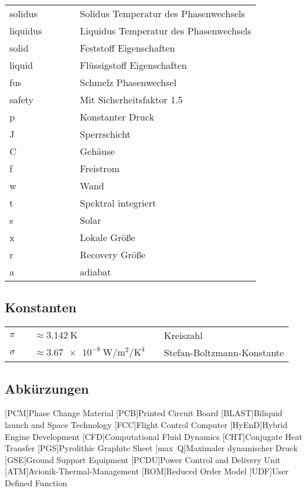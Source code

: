 \begin{supertabular}{p{10mm}p{3mm}p{20mm}p{3mm}l}
solidus && && Solidus Temperatur des Phasenwechsels\\
liquidus && && Liquidus Temperatur des Phasenwechsels\\
solid && && Feststoff Eigenschaften\\
liquid && && Flüssigstoff Eigenschaften\\
fus && && Schmelz Phasenwechsel\\
safety && && Mit Sicherheitsfaktor 1.5\\
p && && Konstanter Druck\\
J && && Sperrschicht\\
C && && Gehäuse\\
f && && Freistrom\\
w && && Wand\\
t && && Spektral integriert\\
s && && Solar\\
x && && Lokale Größe\\
r && && Recovery Größe\\
a && && adiabat\\
\end{supertabular} 

\subsection*{Konstanten}

\begin{supertabular}{p{10mm}p{3mm}p{50mm}p{3mm}l}
$\pi$ && $\approx \SI{3.142}{\kelvin}$ && Kreiszahl\\
$\sigma$ && $\approx \SI{3.67e-8}{\watt\per\meter\squared\per\kelvin\tothe{4}}$ && Stefan-Boltzmann-Konstante\\
\end{supertabular}

\newpage

\subsection*{Abkürzungen}
\begin{acronym}[BLAST]
[PCM]{Phase Change Material}
[PCB]{Printed Circuit Board}
[BLAST]{Biliquid launch and Space Technology}
[FCC]{Flight Control Computer}
[HyEnD]{Hybrid Engine Development}
[CFD]{Computational Fluid Dynamics}
[CHT]{Conjugate Heat Transfer}
[PGS]{Pyrolithic Graphite Sheet}
[max~Q]{Maximaler dynamischer Druck}
[GSE]{Ground Support Equipment}
[PCDU]{Power Control and Delivery Unit}
[ATM]{Avionik-Thermal-Management}
[ROM]{Reduced Order Model}
[UDF]{User Defined Function}
\end{acronym}